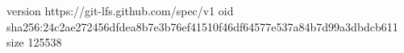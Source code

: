 version https://git-lfs.github.com/spec/v1
oid sha256:24c2ae272456dfdea8b7e3b76ef41510f46df64577e537a84b7d99a3dbdcb611
size 125538
